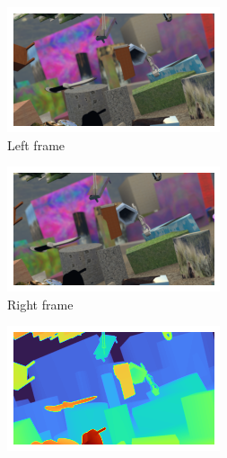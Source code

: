 \documentclass[runningheads]{llncs}
\begin{document}
\begin{figure}[t]
     \centering
     \begin{subfigure}[h]{0.32\linewidth}
         \centering
        \includegraphics[width=\linewidth]{images/left_image_sceneflow.png}
        \caption{Left frame}
     \end{subfigure}
     \hfill
     \begin{subfigure}[h]{0.32\linewidth}
         \centering
        \includegraphics[width=\linewidth]{images/right_image_sceneflow.png}
        \caption{Right frame}
     \end{subfigure}
     \hfill
     \begin{subfigure}[h]{0.32\linewidth}
         \centering
        \includegraphics[width=\linewidth]{gt_sceneflow.png}

\end{subfigure}
\end{figure}
\end{document}
